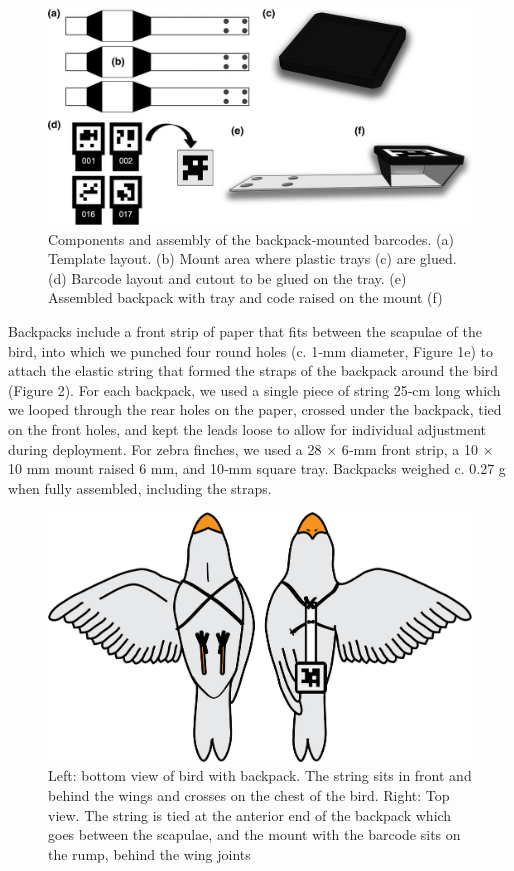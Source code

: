 \documentclass[11pt,a4paper,oneside]{book}
\begin{document}
\begin{figure}[!htb]
    \centering
    \includegraphics{Graving_IMPRS_Thesis/figures/bird_figure_1.jpg}
    \caption{Components and assembly of the backpack‐mounted barcodes. (a) Template layout. (b) Mount area where plastic trays (c) are glued. (d) Barcode layout and cutout to be glued on the tray. (e) Assembled backpack with tray and code raised on the mount (f)}
    \label{fig:bird_figure_1}
\end{figure}


Backpacks include a front strip of paper that fits between the scapulae of the bird, into which we punched four round holes (c. 1‐mm diameter, Figure 1e) to attach the elastic string that formed the straps of the backpack around the bird (Figure 2). For each backpack, we used a single piece of string 25‐cm long which we looped through the rear holes on the paper, crossed under the backpack, tied on the front holes, and kept the leads loose to allow for individual adjustment during deployment. For zebra finches, we used a 28 × 6‐mm front strip, a 10 × 10 mm mount raised 6 mm, and 10‐mm square tray. Backpacks weighed c. 0.27 g when fully assembled, including the straps.

\begin{figure}[!htb]
    \centering
    \includegraphics{Graving_IMPRS_Thesis/figures/bird_figure_2.jpg}
    \caption{Left: bottom view of bird with backpack. The string sits in front and behind the wings and crosses on the chest of the bird. Right: Top view. The string is tied at the anterior end of the backpack which goes between the scapulae, and the mount with the barcode sits on the rump, behind the wing joints}
    \label{fig:bird_figure_2}
\end{figure}
\end{document}
